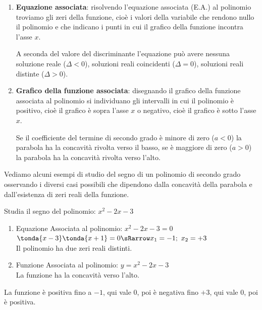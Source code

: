 \begin{enumerate}
\item \textbf{Equazione associata}:
risolvendo l'equazione associata (E.A.) al polinomio troviamo gli zeri della
funzione, cioè i valori della variabile che rendono nullo il polinomio e che
indicano i punti in cui il grafico della funzione incontra l'asse \(x\). 
 

A seconda del valore del discriminante l'equazione può avere 
nessuna soluzione reale (\(\Delta<0\)), 
soluzioni reali coincidenti (\(\Delta=0\)), 
soluzioni reali distinte (\(\Delta>0\)).

\item \textbf{Grafico della funzione associata}:
disegnando il grafico della funzione associata al polinomio si individuano 
gli intervalli in cui il polinomio è positivo, cioè il grafico è sopra 
l'asse \(x\) o negativo, cioè il grafico è sotto l'asse \(x\).

Se il coefficiente del termine di secondo grado è minore di zero (\(a < 0\)) 
la parabola ha la concavità rivolta verso il basso, se è maggiore di zero 
(\(a > 0\)) la parabola ha la concavità rivolta verso l'alto. 
\end{enumerate}

Vediamo alcuni esempi di studio del segno di un polinomio di secondo 
grado osservando i diversi casi possibili che dipendono dalla concavità 
della parabola e dall'esistenza di zeri reali della funzione.

\newcommand{\esebasesegno}[6]{%
\begin{esempio}{}{}
Studia il segno del polinomio: \quad \(#1\)

\begin{enumerate}[left=0mm]
\item Equazione Associata al polinomio: \quad \(#1=0\) \\
#2\\
Il polinomio #3.
\item Funzione Associata al polinomio: \quad \(y = #1\)\\
La funzione ha la concavità verso #4.\\
\raisebox{-6mm}{#5}
\end{enumerate}

\vspace{-.8em}
#6
\end{esempio}
}

\esebasesegno{x^2-2x-3}
{\(\tonda{x-3}\tonda{x+1} = 0 \sRarrow x_1=-1;~x_2=+3\)}
{ha due zeri reali distinti}
{l'alto}
{\segniparauz{-1}{+3}}
{La funzione è positiva fino a \(-1\), qui vale \(0\), poi è negativa 
fino \(+3\), qui vale \(0\), poi è positiva.}

